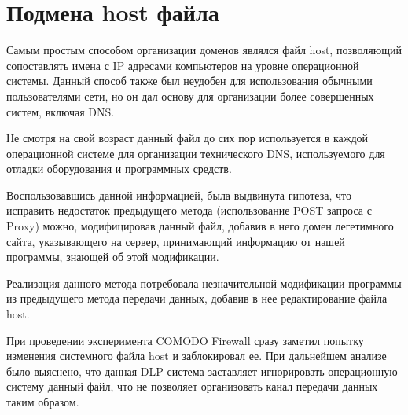 \section{Подмена host файла}


Самым простым способом организации доменов являлся файл host, позволяющий сопоставлять имена с IP адресами компьютеров на уровне операционной системы. Данный способ также был неудобен для использования обычными пользователями сети, но он дал основу для организации более совершенных систем, включая DNS. 

Не смотря на свой возраст данный файл до сих пор используется в каждой операционной системе для организации технического DNS, используемого для отладки оборудования и программных средств.

Воспользовавшись данной информацией, была выдвинута гипотеза, что исправить недостаток предыдущего метода (использование POST запроса с Proxy) можно, модифицировав данный файл, добавив в него домен легетимного сайта, указывающего на сервер, принимающий информацию от нашей программы, знающей об этой модификации.

Реализация данного метода потребовала незначительной модификации программы из предыдущего метода передачи данных, добавив в нее редактирование файла host. 

При проведении эксперимента COMODO Firewall сразу заметил попытку изменения системного файла host и заблокировал ее. При дальнейшем анализе было выяснено, что данная DLP система заставляет игнорировать операционную систему данный файл, что не позволяет организовать канал передачи данных таким образом.
